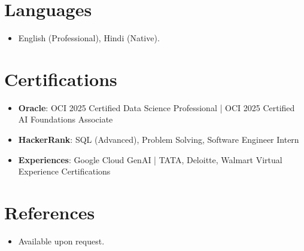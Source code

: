 \documentclass[11pt,a4paper,sans]{moderncv}
\begin{document}
\section{Languages}
\vspace{1pt}
\begin{itemize}
\item English (Professional), Hindi (Native).
\end{itemize}

\section{Certifications}
\vspace{1pt}
\begin{itemize}
\item \textbf{Oracle}: OCI 2025 Certified Data Science Professional | OCI 2025 Certified AI Foundations Associate
\item \textbf{HackerRank}: SQL (Advanced), Problem Solving, Software Engineer Intern
\item \textbf{Experiences}: Google Cloud GenAI | TATA, Deloitte, Walmart Virtual Experience Certifications
\end{itemize}

\section{References}
\vspace{1pt}
\begin{itemize}
\item Available upon request.
\end{itemize}
\end{document}
